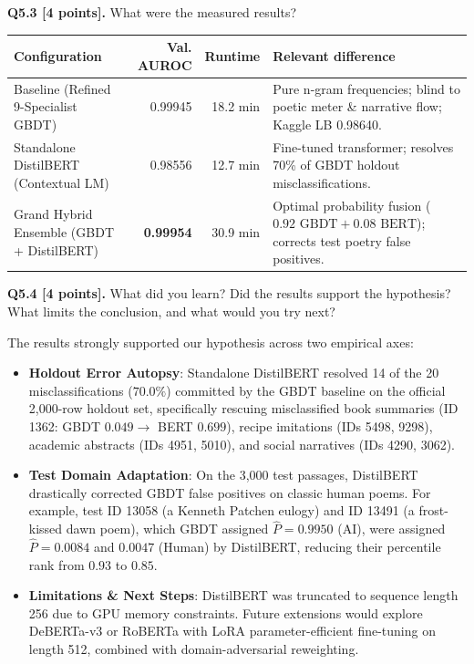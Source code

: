 \documentclass[11pt,letterpaper]{article}
\begin{document}
\vspace{6pt}
\textbf{Q5.3 [4 points].} What were the measured results?

\vspace{2pt}
\begin{tabularx}{\textwidth}{@{}lrrX@{}}
\toprule
\textbf{Configuration} & \textbf{Val. AUROC} & \textbf{Runtime} & \textbf{Relevant difference} \\
\midrule
Baseline (Refined 9-Specialist GBDT) & 0.99945 & 18.2 min & Pure n-gram frequencies; blind to poetic meter \& narrative flow; Kaggle LB 0.98640. \\
Standalone DistilBERT (Contextual LM) & 0.98556 & 12.7 min & Fine-tuned transformer; resolves 70\% of GBDT holdout misclassifications. \\
Grand Hybrid Ensemble (GBDT + DistilBERT) & \textbf{0.99954} & 30.9 min & Optimal probability fusion ($0.92\text{ GBDT} + 0.08\text{ BERT}$); corrects test poetry false positives. \\
\bottomrule
\end{tabularx}

\vspace{6pt}
\textbf{Q5.4 [4 points].} What did you learn? Did the results support the hypothesis? What limits the conclusion, and what would you try next?

The results strongly supported our hypothesis across two empirical axes:
\begin{itemize}[leftmargin=*,itemsep=1pt]
    \item \textbf{Holdout Error Autopsy}: Standalone DistilBERT resolved 14 of the 20 misclassifications ($70.0\%$) committed by the GBDT baseline on the official 2,000-row holdout set, specifically rescuing misclassified book summaries (ID 1362: GBDT $0.049 \to$ BERT $0.699$), recipe imitations (IDs 5498, 9298), academic abstracts (IDs 4951, 5010), and social narratives (IDs 4290, 3062).
    \item \textbf{Test Domain Adaptation}: On the 3,000 test passages, DistilBERT drastically corrected GBDT false positives on classic human poems. For example, test ID 13058 (a Kenneth Patchen eulogy) and ID 13491 (a frost-kissed dawn poem), which GBDT assigned $\hat{P} = 0.9950$ (AI), were assigned $\hat{P} = 0.0084$ and $0.0047$ (Human) by DistilBERT, reducing their percentile rank from $0.93$ to $0.85$.
    \item \textbf{Limitations \& Next Steps}: DistilBERT was truncated to sequence length 256 due to GPU memory constraints. Future extensions would explore DeBERTa-v3 or RoBERTa with LoRA parameter-efficient fine-tuning on length 512, combined with domain-adversarial reweighting.
\end{itemize}
\end{document}
